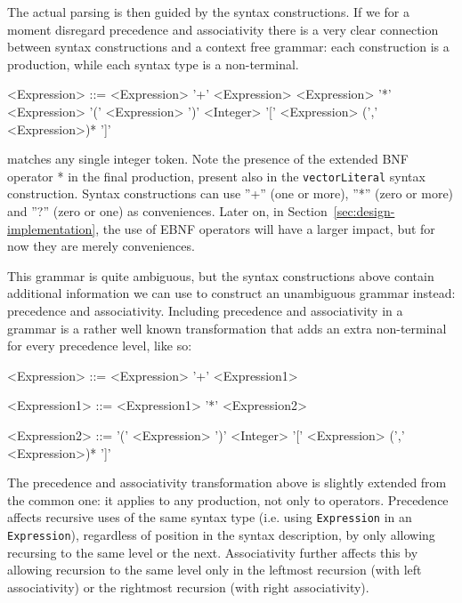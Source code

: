 \documentclass{kththesis}
\begin{document}
The actual parsing is then guided by the syntax constructions. If we for a moment disregard precedence and associativity there is a very clear connection between syntax constructions and a context free grammar: each construction is a production, while each syntax type is a non-terminal.

\setlength{\grammarindent}{8em}
\begin{grammar}
<Expression> ::= <Expression> '+' <Expression>
  \alt <Expression> '*' <Expression>
  \alt '(' <Expression> ')'
  \alt <Integer>
  \alt '[' <Expression> (',' <Expression>)* ']'
\end{grammar}

 matches any single integer token. Note the presence of the extended BNF operator * in the final production, present also in the \texttt{vectorLiteral} syntax construction. Syntax constructions can use ''+'' (one or more), ''*'' (zero or more) and ''?'' (zero or one) as conveniences. Later on, in Section~\ref{sec:design-implementation}, the use of EBNF operators will have a larger impact, but for now they are merely conveniences.

This grammar is quite ambiguous, but the syntax constructions above contain additional information we can use to construct an unambiguous grammar instead: precedence and associativity. Including precedence and associativity in a grammar is a rather well known transformation that adds an extra non-terminal for every precedence level, like so:

\setlength{\grammarindent}{8em}
\begin{grammar}
<Expression> ::= <Expression> '+' <Expression1>

<Expression1> ::= <Expression1> '*' <Expression2>

<Expression2> ::= '(' <Expression> ')'
  \alt <Integer>
  \alt '[' <Expression> (',' <Expression>)* ']'
\end{grammar}

The precedence and associativity transformation above is slightly extended from the common one: it applies to any production, not only to operators. Precedence affects recursive uses of the same syntax type (i.e. using \texttt{Expression} in an \texttt{Expression}), regardless of position in the syntax description, by only allowing recursing to the same level or the next. Associativity further affects this by allowing recursion to the same level only in the leftmost recursion (with left associativity) or the rightmost recursion (with right associativity).
\end{document}
